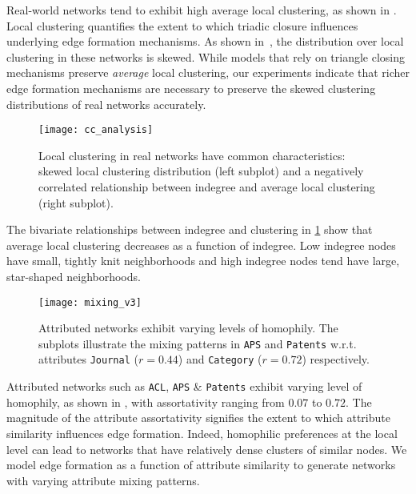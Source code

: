 Real-world networks tend to exhibit high average local clustering, as shown in
. Local clustering quantifies the extent to which triadic
closure influences underlying edge formation mechanisms.
As shown
in~, the distribution over local clustering in
these networks is skewed. While models  \cite{klemm2002highly,holme2002growing}
that rely on triangle closing mechanisms preserve \textit{average} local clustering,
our experiments indicate that richer edge formation mechanisms are necessary to
preserve the skewed clustering distributions of real networks accurately.
\begin{figure}[!h]
 \centering
 \texttt{[image: cc\_analysis]}
 \caption{
    Local clustering in real networks have common characteristics:
    skewed local clustering distribution (left subplot) and a negatively correlated
    relationship between indegree and average local clustering (right subplot).
 }
 \label{fig:cc_dc}
\end{figure}

The bivariate relationships between indegree and clustering in \cref{fig:cc_dc}
show that average local clustering decreases as a function of indegree. Low
indegree nodes have small, tightly knit neighborhoods and high indegree
nodes tend have large, star-shaped neighborhoods.
\begin{figure}[!h]
 \centering
 \texttt{[image: mixing\_v3]}
 \caption{
    Attributed networks exhibit varying levels of homophily. The subplots
    illustrate the mixing patterns in \texttt{APS} and \texttt{Patents} w.r.t.
    attributes \texttt{Journal} ($r=0.44$) and \texttt{Category} ($r=0.72$) respectively.
 }
 \label{fig:mixing}
\end{figure}

Attributed networks such as \texttt{ACL}, \texttt{APS} \& \texttt{Patents} exhibit
varying level of homophily, as shown in , with assortativity
ranging from $0.07$ to $0.72$. The magnitude of the attribute assortativity
signifies the extent to which attribute similarity influences edge formation. Indeed,
homophilic preferences at the local level can lead to networks that have relatively
dense clusters of similar nodes. We model edge formation as a function of attribute
similarity to generate networks with varying attribute mixing patterns.

